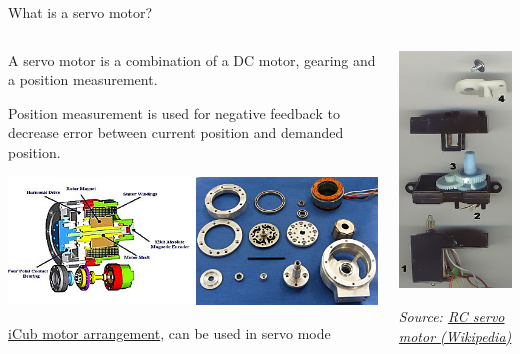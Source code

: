 \documentclass[compress]{beamer}
\newcommand{\source}[2]{{\tiny\it Source: \href{#1}{#2}}}
\begin{document}
\begin{frame}{What is a servo motor?}

    \begin{columns}
        \begin{column}{0.5\linewidth}
            A servo motor is a combination of a DC motor, gearing and a position
            measurement.

            \vspace{1em}

            Position measurement is used for negative feedback to decrease error
            between current position and demanded position.

            \vspace{1em}

            \includegraphics[width=\linewidth]{image18}

            \href{http://www.iit.it/en/advanced-robotics/projects/the-lower-body-of-the-child-humanoid-robot-icub.html}{iCub motor arrangement}, can be used in servo mode

        \end{column}
        \begin{column}{0.5\linewidth}
            \begin{center}
                \includegraphics[height=0.7\paperheight]{image17}

                \source{http://en.wikipedia.org/wiki/Servomechanism}{RC servo motor (Wikipedia)}
            \end{center}
        \end{column}
    \end{columns}

\end{frame}
\end{document}
